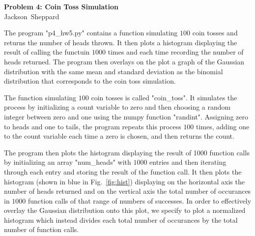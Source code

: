 \documentclass[12pt]{article}
\newcommand\thisis{Problem 4: Coin Toss Simulation}
\newcommand\theauthor{Jackson~Sheppard}
\begin{document}
\thispagestyle{firstpg}

\noindent
{\sffamily\bfseries\huge \thisis}\\

\noindent
{\large\sffamily \theauthor}

\vspace*{20bp}


The program "p4\_hw5.py" contains a function simulating $100$ coin tosses and
returns the number of heads thrown. It then plots a histogram displaying the
result of calling the functuin $1000$ times and each time recording the number
of heads returned. The program then overlays on the plot a graph of the Gaussian
distribution with the same mean and standard deviation as the binomial
distribution that corresponds to the coin toss simulation.

The function simulating $100$ coin tosses is called "coin\_toss". It simulates
the process by initializing a count variable to zero and then choosing a random
integer between zero and one using the numpy function "randint". Assigning zero
to heads and one to tails, the program repeats this process $100$ times, adding
one to the count variable each time a zero is chosen, and then returns the
count.

The program then plots the histogram displaying the result of 1000 function
calls by initializing an array "num\_heads" with $1000$ entries and then
iterating through each entry and storing the result of the function call.
It then plots the histogram (shown in blue in Fig.~\ref{fig:hist}) displaying
on the horizontal axis the number of heads returned and on the vertical axis the
total number of occurances in $1000$ function calls of that range of numbers of
successes. In order to effectively overlay the Gaussian distribution onto this
plot, we specify to plot a normalized histogram which instead divides each total
number of occurances by the total number of function calls.
\end{document}
